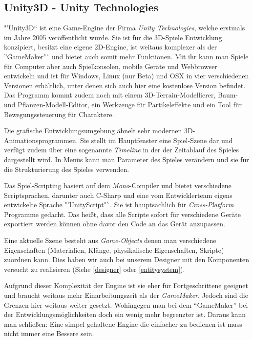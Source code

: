 \subsection{Unity3D - Unity Technologies}

"'Unity3D"` ist eine Game-Engine der Firma \textit{Unity Technologies}, welche erstmals im Jahre 2005 veröffentlicht wurde. Sie ist für die 3D-Spiele Entwicklung konzipiert, besitzt eine eigene 2D-Engine, ist weitaus komplexer als der "'GameMaker"` und bietet auch somit mehr Funktionen. Mit ihr kann man Spiele für Computer aber auch Spielkonsolen, mobile Geräte und Webbrowser entwickeln und ist für Windows, Linux (nur Beta) und OSX in vier verschiedenen Versionen erhältlich, unter denen sich auch hier eine kostenlose Version befindet. Das Programm kommt zudem noch mit einem 3D-Terrain-Modellierer, Baum- und Pflanzen-Modell-Editor, ein Werkzeuge für Partikeleffekte und ein Tool für Bewegungssteuerung für Charaktere.

Die grafische Entwicklungsumgebung ähnelt sehr modernen 3D-Animationsprogrammen. Sie stellt im Hauptfenster eine Spiel-Szene dar und verfügt zudem über eine sogenannte \textit{Timeline} in der der Zeitablauf des Spieles dargestellt wird. In Menüs kann man Parameter des Spieles verändern und sie für die Strukturierung des Spieles verwenden. 

Das Spiel-Scripting basiert auf dem \textit{Mono}-Compiler und bietet verschiedene Scriptsprachen, darunter auch C-Sharp und eine vom Entwicklerteam eigens entwickelte Sprache "'UnityScript"`. Sie ist hauptsächlich für \textit{Cross-Platform} Programme gedacht. Das heißt, dass alle Scripte sofort für verschiedene Geräte exportiert werden können ohne davor den Code an das Gerät anzupassen.

Eine aktuelle Szene besteht aus \textit{Game-Objects} denen man verschiedene Eigenschaften (Materialien, Klänge, physikalische Eigenschaften, Skripte) zuordnen kann. Dies haben wir auch bei unserem Designer mit den Komponenten versucht zu realisieren (Siehe \ref{designer} oder \ref{entitysystem}).

Aufgrund dieser Komplexität der Engine ist sie eher für Fortgeschrittene geeignet und braucht weitaus mehr Einarbeitungszeit als der \textit{GameMaker}. Jedoch sind die Grenzen hier weitaus weiter gesetzt. Wohingegen man bei dem "`GameMaker"' bei der Entwicklungsmöglichkeiten doch ein wenig mehr begrenzter ist.
Daraus kann man schließen: Eine simpel gehaltene Engine die einfacher zu bedienen ist muss nicht immer eine Bessere sein.
